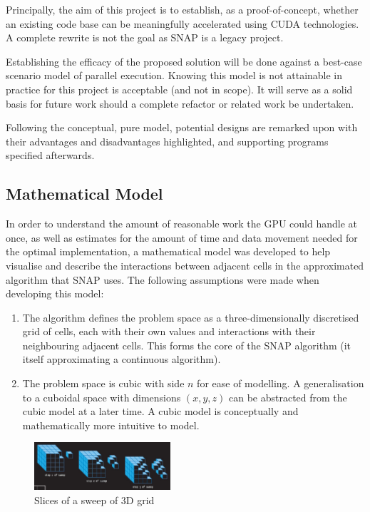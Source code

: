 \documentclass[conference]{IEEEtran}
\begin{document}
Principally, the aim of this project is to establish, as a proof-of-concept, whether an existing code base can be meaningfully accelerated using CUDA technologies. A complete rewrite is not the goal as SNAP is a legacy project.

Establishing the efficacy of the proposed solution will be done against a best-case scenario model of parallel execution. Knowing this model is not attainable in practice for this project is acceptable (and not in scope). It will serve as a solid basis for future work should a complete refactor or related work be undertaken.

Following the conceptual, pure model, potential designs are remarked upon with their advantages and disadvantages highlighted, and supporting programs specified afterwards.


\subsection{Mathematical Model}

In order to understand the amount of reasonable work the GPU could handle at once, as well as estimates for the amount of time and data movement needed for the optimal implementation, a mathematical model was developed to help visualise and describe the interactions between adjacent cells in the approximated algorithm that SNAP uses. The following assumptions were made when developing this model:

\begin{enumerate}

\item The algorithm defines the problem space as a three-dimensionally discretised grid of cells, each with their own values and interactions with their neighbouring adjacent cells. This forms the core of the SNAP algorithm (it itself approximating a continuous algorithm).

\item The problem space is cubic with side $ n $ for ease of modelling. A generalisation to a cuboidal space with dimensions $ (x, y, z) $ can be abstracted from the cubic model at a later time. A cubic model is conceptually and mathematically more intuitive to model.

\end{enumerate}

\begin{figure}[h!]
\centering
\includegraphics[width=0.45\textwidth]{images/Sweep.jpg}
\caption{Slices of a sweep of 3D grid}
\label{fig:3dsweepslice}
\end{figure}
\end{document}
